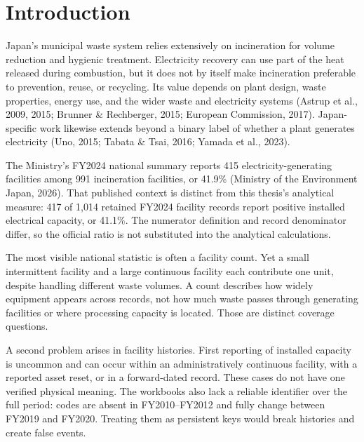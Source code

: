 \documentclass[12pt,a4paper]{article}
\begin{document}
\clearpage
\tableofcontents
\clearpage
\listoffigures
{}
\vspace{1.5em}
\listoftables
{}
\clearpage
{}

\section{Introduction}

Japan's municipal waste system relies extensively on incineration for volume
reduction and hygienic treatment. Electricity recovery can use part of the heat
released during combustion, but it does not by itself make incineration
preferable to prevention, reuse, or recycling. Its value depends on plant
design, waste properties, energy use, and the wider waste and electricity
systems (Astrup et al., 2009, 2015; Brunner \& Rechberger, 2015; European
Commission, 2017). Japan-specific work likewise extends beyond a binary label
of whether a plant generates electricity (Uno, 2015; Tabata \& Tsai, 2016;
Yamada et al., 2023).

The Ministry's FY2024 national summary reports 415 electricity-generating
facilities among 991 incineration facilities, or 41.9\% (Ministry of the
Environment Japan, 2026). That published context is distinct from this thesis's
analytical measure: 417 of 1,014 retained FY2024 facility records report
positive installed electrical capacity, or 41.1\%. The numerator definition and
record denominator differ, so the official ratio is not substituted into the
analytical calculations.

The most visible national statistic is often a facility count. Yet a small
intermittent facility and a large continuous facility each contribute one unit,
despite handling different waste volumes. A count describes how widely
equipment appears across records, not how much waste passes through generating
facilities or where processing capacity is located. Those are distinct coverage
questions.

A second problem arises in facility histories. First reporting of installed
capacity is uncommon and can occur within an administratively continuous
facility, with a reported asset reset, or in a forward-dated record. These cases
do not have one verified physical meaning. The workbooks also lack a reliable
identifier over the full period: codes are absent in FY2010--FY2012 and fully
change between FY2019 and FY2020. Treating them as persistent keys would break
histories and create false events.
\end{document}

